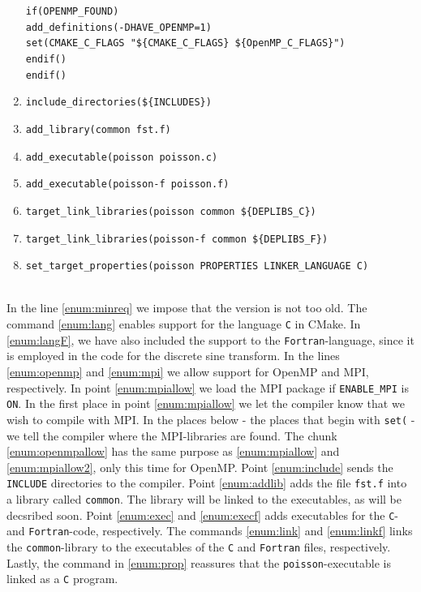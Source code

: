 \documentclass{article}
\begin{document}
\begin{enumerate}
                                        \text{ \hspace{1pt} } \texttt{if(OPENMP\_FOUND)} \\
                                        \text{ \hspace{13pt} } \texttt{add\_definitions(-DHAVE\_OPENMP=1)} \\
                                        \text{ \hspace{13pt} } \texttt{set(CMAKE\_C\_FLAGS "\$\{CMAKE\_C\_FLAGS\} \$\{OpenMP\_C\_FLAGS\}")} \\
                                        \text{ \hspace{1pt} } \texttt{endif()} \\
                                        \texttt{endif()}
    \item \label{enum:include} \texttt{include\_directories(\$\{INCLUDES\})}
    \item \label{enum:addlib} \texttt{add\_library(common fst.f)} 
    \item \label{enum:exec} \texttt{add\_executable(poisson poisson.c)}
    \item \label{enum:execf} \texttt{add\_executable(poisson-f poisson.f)}
    \item \label{enum:link} \texttt{target\_link\_libraries(poisson common \$\{DEPLIBS\_C\})}
    \item \label{enum:linkf} \texttt{target\_link\_libraries(poisson-f common \$\{DEPLIBS\_F\})}
    \item \label{enum:prop} \texttt{set\_target\_properties(poisson PROPERTIES LINKER\_LANGUAGE C)}
\end{enumerate}
\
\\
In the line \ref{enum:minreq} we impose that the version is not too old. The command \ref{enum:lang} enables support for the language \texttt{C} in CMake. In \ref{enum:langF}, we have also included the support to the \texttt{Fortran}-language, since it is employed in the code for the discrete sine transform. In the lines \ref{enum:openmp} and \ref{enum:mpi} we allow support for OpenMP and MPI, respectively. In point \ref{enum:mpiallow} we load the MPI package if \texttt{ENABLE\_MPI} is \texttt{ON}. In the first place in point \ref{enum:mpiallow} we let the compiler know that we wish to compile with MPI. In the places below - the places that begin with \texttt{set(} - we tell the compiler where the MPI-libraries are found. The chunk \ref{enum:openmpallow} has the same purpose as \ref{enum:mpiallow} and \ref{enum:mpiallow2}, only this time for OpenMP. Point \ref{enum:include} sends the \texttt{INCLUDE} directories to the compiler. Point \ref{enum:addlib} adds the file \texttt{fst.f} into a library called \texttt{common}. The library will be linked to the executables, as will be decsribed soon. Point \ref{enum:exec} and \ref{enum:execf} adds executables for the \texttt{C}- and \texttt{Fortran}-code, respectively. The commands \ref{enum:link} and \ref{enum:linkf} links the \texttt{common}-library to the executables of the \texttt{C} and \texttt{Fortran} files, respectively. Lastly, the command in \ref{enum:prop} reassures that the \texttt{poisson}-executable is linked as a \texttt{C} program.
\end{document}
